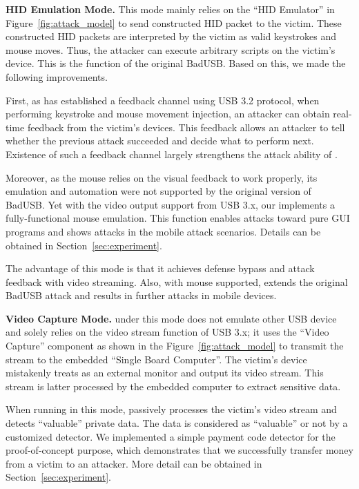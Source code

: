 \textbf{\ac{HID} Emulation Mode.} This mode mainly relies on the ``\ac{HID} Emulator'' in Figure~\ref{fig:attack_model} to
send constructed \ac{HID} packet to the victim. These constructed \ac{HID} packets are
interpreted by the victim as valid keystrokes and mouse moves. Thus, the
attacker can execute arbitrary scripts on the victim's device. This is the
function of the original BadUSB. Based on this, we made the following
improvements.

First, as \tool has established a feedback channel using \ac{USB} 3.2 protocol, when performing keystroke and mouse movement injection, an attacker can obtain real-time feedback from the victim's devices. This feedback allows an attacker to tell whether the previous attack succeeded and decide what to perform next. Existence of such a feedback channel largely strengthens the attack ability of \tool.

Moreover, as the mouse relies on the visual feedback to work properly, its
emulation and automation were not supported by the original version of BadUSB.
Yet with the video output support from \ac{USB} 3.x, our \tool implements a
fully-functional mouse emulation. This function enables attacks toward pure \ac{GUI}
programs and shows attacks in the mobile attack scenarios. Details can
be obtained in Section~\ref{sec:experiment}.

The advantage of this mode is that it achieves defense bypass and attack
feedback with video streaming.
Also, with mouse
supported, \tool extends the original BadUSB attack and results in further attacks in
mobile devices.

\textbf{Video Capture Mode.} \tool under this mode does not emulate other
USB device and solely relies on the video stream function of \ac{USB} 3.x; it uses the
``Video Capture'' component as shown in the Figure~\ref{fig:attack_model} to transmit the stream to the embedded ``Single Board Computer''.
The victim's device mistakenly treats \tool as an external monitor
and output its video stream. This stream is latter processed by the embedded
computer to extract sensitive data.

When running in this mode, \tool passively processes the victim's video stream
and detects ``valuable'' private data.  The data is considered as
``valuable'' or not by a customized detector. We implemented a simple
payment code detector for the proof-of-concept purpose, which demonstrates that we successfully transfer money from a victim to an
attacker. More detail can be obtained in Section~\ref{sec:experiment}.

